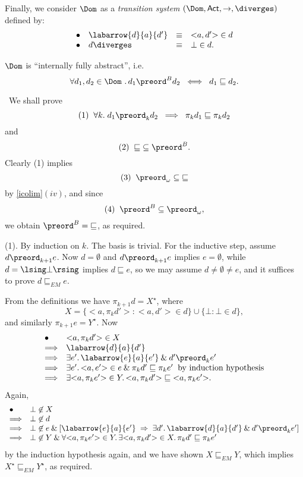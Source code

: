 Finally, we consider $\Dom$ as a {\em transition system} $(\Dom , {\sf Act},
\rightarrow , \diverges )$ defined by:
\[ \begin{array}{clcl}
\bullet & \labarrow{d}{a}{d'}  & \equiv & {<}a, d' {>} \in d \\
\bullet & d \diverges & \equiv & \bot \in d .
\end{array} \]

\begin{proposition}
\label{ifs}
$\Dom$ is ``internally fully abstract'', i.e.
\[ \forall d_{1}, d_{2} \in \Dom\ . \, d_{1} {\preord}^{B} d_{2} \;\;
\Longleftrightarrow \;\; d_{1} \sqsubseteq d_{2} . \]
\end{proposition}

\proof\ We shall prove
\[ (1) \;\; \forall k . \; d_{1} \preord_{k} d_{2} \;\; \Longrightarrow \;\; \pi_{k}
d_{1} \sqsubseteq \pi_{k} d_{2} \]
and
\[ (2) \;\; {\sqsubseteq} \subseteq {\preord^{B}} . \]
Clearly (1) implies
\[ (3) \;\; {\preord_{\omega}} \subseteq {\sqsubseteq}  \]
by \ref{icolim}$(iv)$, and since
\[ (4) \;\; {\preord^{B}} \subseteq {\preord_{\omega}} , \]
we obtain ${\preord^{B}} = {\sqsubseteq}$, as required.

\noindent (1). By induction on $k$. The basis is trivial. 
For the inductive step, assume $d \preord_{k+1} e$.
Now $d = \emptyset$ and $d \preord_{k+1} e$ implies $e = \emptyset$,
while $d = \lsing \bot \rsing$ implies $d \sqsubseteq e$, so we may
assume $d \not= \emptyset \not= e$, and it suffices to prove $d
\sqsubseteq_{EM} e$.

From the definitions we have $\pi_{k+1} d = X^{\star}$, where
\[ X = \{ {<}a, \pi_{k} d' {>} : {<}a, d' {>} \in d \} \cup \{ \bot : \bot \in d \} , 
\]
and similarly $\pi_{k+1} e = Y^{\star}$. Now
\[ \begin{array}{ll}
\bullet & {<}a, \pi_{k} d' {>} \in X \\
\Longrightarrow & \labarrow{d}{a}{d'} \\
\Longrightarrow & \exists e' . \, \labarrow{e}{a}{e'} \: \& \: d' \preord_{k} e' \\
\Longrightarrow & \exists e' . \, {<}a, e' {>} \in e \: \& \: \pi_{k} d' \sqsubseteq
\pi_{k} e' 
\;\; \mbox{by induction hypothesis} \\
\Longrightarrow & \exists {<}a, \pi_{k} e' {>} \in Y . \, {<}a, \pi_{k} d' {>}
\sqsubseteq {<}a, \pi_{k} e' {>} .
\end{array} \]
Again,
\[ \begin{array}{ll}
\bullet & \bot \not\in X \\
\Longrightarrow & \bot \not\in d \\
\Longrightarrow & \bot \not\in e \: \& \: [ \labarrow{e}{a}{e'}  \; \Rightarrow \;
\exists d' . \, \labarrow{d}{a}{d'} \: \& \: d' \preord_{k} e' ] \\
\Longrightarrow & \bot \not\in Y \: \& \: \forall {<}a, \pi_{k} e' {>} \in Y . \,
\exists {<}a, \pi_{k} d' {>} \in X . \, \pi_{k} d' \sqsubseteq \pi_{k} e' 
\end{array} \]
by the induction hypothesis again,
and we have shown $X \sqsubseteq_{EM} Y$, which implies $X^{\star}
\sqsubseteq_{EM} Y^{\star}$, as required.

